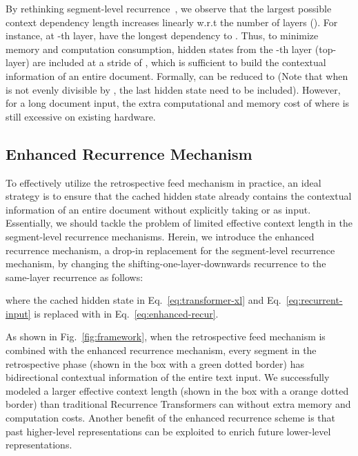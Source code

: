 \documentclass[11pt,a4paper]{article}
\begin{document}
By rethinking segment-level recurrence~\citep{transformer_xl}, we observe that the largest possible context dependency length increases linearly w.r.t the number of layers (). For instance, at -th layer,  have the longest dependency to . Thus, to minimize memory and computation consumption, hidden states from the -th layer (top-layer) are included at a stride of , which is sufficient to build the contextual information of an entire document. Formally,  can be reduced to  (Note that when  is not evenly divisible by , the last hidden state   need to be included). However, for a long document input, the extra computational and memory cost of  where  is still excessive on existing hardware.





\subsection{Enhanced Recurrence Mechanism}\label{sec:lift-mem}
To effectively utilize the retrospective feed mechanism in practice, an ideal strategy is to ensure that the cached hidden state  already contains the contextual information of an entire document without explicitly taking  or  as input. Essentially, we should tackle the problem of limited effective context length in the segment-level recurrence mechanisms. Herein, we introduce the enhanced recurrence mechanism, a drop-in replacement for the segment-level recurrence mechanism, by changing the shifting-one-layer-downwards recurrence to the same-layer recurrence as follows: 


where the cached hidden state  in Eq.~\ref{eq:transformer-xl} and Eq.~\ref{eq:recurrent-input} is replaced with  in Eq.~\ref{eq:enhanced-recur}. 

As shown in Fig.~\ref{fig:framework}, when the retrospective feed mechanism is combined with the enhanced recurrence mechanism, every segment in the retrospective phase (shown in the box with a green dotted border) has bidirectional contextual information of the entire text input. We successfully modeled a larger effective context length (shown in the box with a orange dotted border) than traditional Recurrence Transformers can without extra memory and computation costs. Another benefit of the enhanced recurrence scheme is that past higher-level representations can be exploited to enrich future lower-level representations. 
\end{document}
